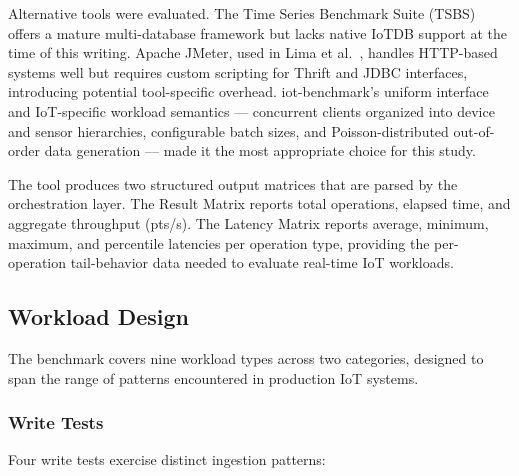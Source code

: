 Alternative tools were evaluated. The Time Series Benchmark Suite (TSBS) offers a mature
multi-database framework but lacks native IoTDB support at the time of this writing.
Apache JMeter, used in Lima et al.~\cite{lima2024avaliando}, handles HTTP-based systems well
but requires custom scripting for Thrift and JDBC interfaces, introducing potential tool-specific
overhead. iot-benchmark's uniform interface and IoT-specific workload semantics ---
concurrent clients organized into device and sensor hierarchies, configurable batch sizes,
and Poisson-distributed out-of-order data generation --- made it the most appropriate choice
for this study.

The tool produces two structured output matrices that are parsed by the orchestration layer.
The Result Matrix reports total operations, elapsed time, and aggregate throughput (pts/s).
The Latency Matrix reports average, minimum, maximum, and percentile latencies per operation
type, providing the per-operation tail-behavior data needed to evaluate real-time IoT workloads.

\subsection{Workload Design}
\label{sec:workload}

The benchmark covers nine workload types across two categories, designed to span the range
of patterns encountered in production IoT systems.

\subsubsection{Write Tests}

Four write tests exercise distinct ingestion patterns:

